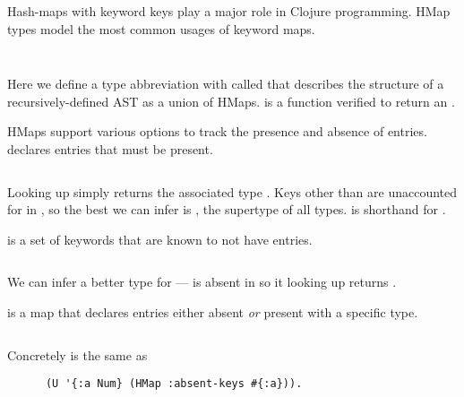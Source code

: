 Hash-maps with keyword keys play a major role in Clojure programming.
HMap types model the most common usages of keyword maps.

\begin{Code}
\begin{exmp}
\inputminted[firstline=6,lastline=8]{clojure}{code/demo/src/demo/hmap.clj}
\inputminted[firstline=27,lastline=29]{clojure}{code/demo/src/demo/hmap.clj}
\end{exmp}
\end{Code}

Here we define a type abbreviation with  called 
that describes the structure of a recursively-defined AST as a union of HMaps.
 is a function verified to return an .

HMaps support various options to track the presence and absence of entries.
 declares entries that must be present.

\begin{Code}
\begin{exmp}
\inputminted[firstline=58,lastline=64]{clojure}{code/demo/src/demo/hmap.clj}
\end{exmp}
\end{Code}
Looking up  simply returns the associated type .
Keys other than  are unaccounted for in , so 
the best we can infer is , the supertype of all types.
 is shorthand for .

 is a set of keywords that are known to not have entries.
\begin{Code}
\begin{exmp}
\inputminted[firstline=66,lastline=73]{clojure}{code/demo/src/demo/hmap.clj}
\end{exmp}
\end{Code}
We can infer a better type for --- is absent in 
so it looking up  returns .

 is a map that declares entries either absent \emph{or}
present with a specific type. 

\begin{Code}
\begin{exmp}
\inputminted[firstline=5,lastline=12]{clojure}{code/demo/src/demo/hmap_path.clj}
\end{exmp}
\end{Code}

Concretely 
is the same as
\begin{verbatim}
      (U '{:a Num} (HMap :absent-keys #{:a})).
\end{verbatim}


